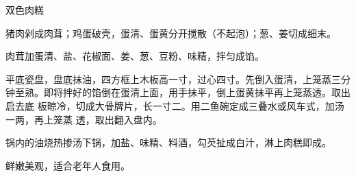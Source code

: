 %
%
%
%
%
%
%
\begin{recipe}[金银肉糕]{双色肉糕}

\ingredients


\preparation

\step 猪肉剁成肉茸；鸡蛋破壳，蛋清、蛋黄分开搅散（不起泡）；葱、姜切成细末。

\step 肉茸加蛋清、盐、花椒面、姜、葱、豆粉、味精，拌匀成馅。

\step 平底瓷盘，盘底抹油，四方框上木板高一寸，过心四寸。先倒入蛋清，上笼蒸三分
钟至熟。即将拌好的馅倒在蛋清上面，用手抹平，倒上蛋黄抹平再上笼蒸透。取出启去底
板晾冷，切成大骨牌片，长一寸二。用二鱼碗定成三叠水或风车式，加汤一两，再上笼蒸
透，取出翻入盘内。

\step 锅内的油烧热掺汤下锅，加盐、味精、料酒，勾芡扯成白汁，淋上肉糕即成。

\features

鲜嫩美观，适合老年人食用。

\end{recipe}

